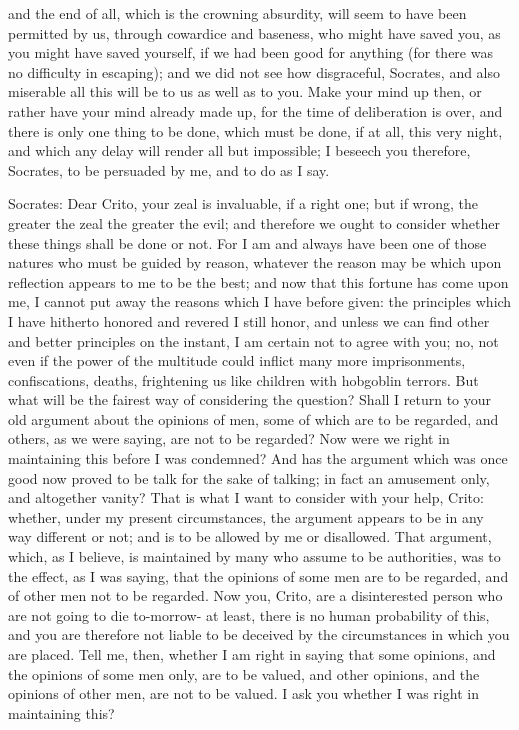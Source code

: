 and the end of all, which is the crowning absurdity, will seem to
have been permitted by us, through cowardice and baseness, who might
have saved you, as you might have saved yourself, if we had been good
for anything (for there was no difficulty in escaping); and we did
not see how disgraceful, Socrates, and also miserable all this will
be to us as well as to you. Make your mind up then, or rather have
your mind already made up, for the time of deliberation is over, and
there is only one thing to be done, which must be done, if at all,
this very night, and which any delay will render all but impossible;
I beseech you therefore, Socrates, to be persuaded by me, and to do
as I say. 

Socrates: Dear Crito, your zeal is invaluable, if a right one; but if wrong,
the greater the zeal the greater the evil; and therefore we ought
to consider whether these things shall be done or not. For I am and
always have been one of those natures who must be guided by reason,
whatever the reason may be which upon reflection appears to me to
be the best; and now that this fortune has come upon me, I cannot
put away the reasons which I have before given: the principles which
I have hitherto honored and revered I still honor, and unless we can
find other and better principles on the instant, I am certain not
to agree with you; no, not even if the power of the multitude could
inflict many more imprisonments, confiscations, deaths, frightening
us like children with hobgoblin terrors. But what will be the fairest
way of considering the question? Shall I return to your old argument
about the opinions of men, some of which are to be regarded, and others,
as we were saying, are not to be regarded? Now were we right in maintaining
this before I was condemned? And has the argument which was once good
now proved to be talk for the sake of talking; in fact an amusement
only, and altogether vanity? That is what I want to consider with
your help, Crito: whether, under my present circumstances, the argument
appears to be in any way different or not; and is to be allowed by
me or disallowed. That argument, which, as I believe, is maintained
by many who assume to be authorities, was to the effect, as I was
saying, that the opinions of some men are to be regarded, and of other
men not to be regarded. Now you, Crito, are a disinterested person
who are not going to die to-morrow- at least, there is no human probability
of this, and you are therefore not liable to be deceived by the circumstances
in which you are placed. Tell me, then, whether I am right in saying
that some opinions, and the opinions of some men only, are to be valued,
and other opinions, and the opinions of other men, are not to be valued.
I ask you whether I was right in maintaining this? 

